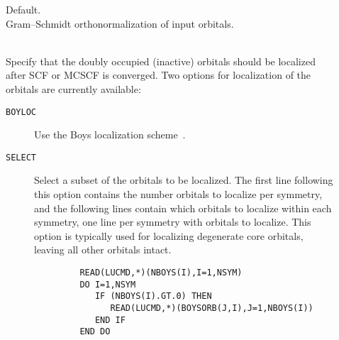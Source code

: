 \begin{description}
\item[]
  Default.\\
  Gram--Schmidt orthonormalization of input orbitals.

\item[]
   \\
  Specify that the doubly occupied (inactive) orbitals should be localized after SCF 
  or MCSCF is converged.
  Two options for localization of the orbitals are currently available:
  \begin{description}
  \item[{\tt BOYLOC\ }] Use the Boys localization scheme~\cite{Boyloc}.
  \item[{\tt SELECT\ }] Select a subset of the orbitals to be localized. The first
  line following this option contains the number orbitals to localize per symmetry,
  and the following lines contain which orbitals to localize within each symmetry,
  one line per symmetry with orbitals to localize.
  This option is typically used for localizing degenerate 
  core orbitals, leaving all other orbitals intact.
  \begin{verbatim}
         READ(LUCMD,*)(NBOYS(I),I=1,NSYM)
         DO I=1,NSYM
            IF (NBOYS(I).GT.0) THEN
               READ(LUCMD,*)(BOYSORB(J,I),J=1,NBOYS(I))
            END IF
         END DO
   \end{verbatim}
  \end{description}


\end{description}
